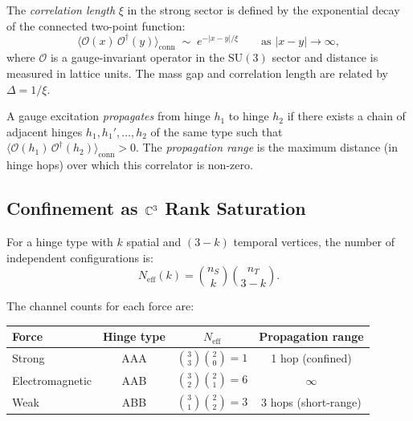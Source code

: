 \begin{definition}
\label{def:correlation}
The \emph{correlation length} $\xi$ in the strong sector is defined by
the exponential decay of the connected two-point function:
\begin{equation}
\langle \mathcal{O}(x)\, \mathcal{O}^\dagger(y) \rangle_{\mathrm{conn}}
\;\sim\; e^{-|x - y|/\xi} \qquad \text{as } |x-y| \to \infty,
\end{equation}
where $\mathcal{O}$ is a gauge-invariant operator in the
$\mathrm{SU}(3)$ sector and distance is measured in lattice units.
The mass gap and correlation length are related by $\Delta = 1/\xi$.
\end{definition}

\begin{definition}[Propagation]
\label{def:propagation}
A gauge excitation \emph{propagates} from hinge $h_1$ to hinge $h_2$
if there exists a chain of adjacent hinges $h_1, h_1', \ldots, h_2$
of the same type such that $\langle \mathcal{O}(h_1)\,
\mathcal{O}^\dagger(h_2) \rangle_{\mathrm{conn}} > 0$.
The \emph{propagation range} is the maximum distance (in hinge hops)
over which this correlator is non-zero.
\end{definition}

\subsection{Confinement as $\mathbb{C}^3$ Rank Saturation}
\label{sec:confinement}

\begin{definition}
For a hinge type with $k$ spatial and $(3-k)$ temporal vertices, the
number of independent configurations is:
\begin{equation}
N_{\mathrm{eff}}(k) = \binom{n_S}{k} \binom{n_T}{3-k}.
\end{equation}
\end{definition}

\noindent
The channel counts for each force are:

\begin{center}
\begin{tabular}{lccc}
\hline
Force & Hinge type & $N_{\mathrm{eff}}$ & Propagation range \\
\hline
Strong & AAA & $\binom{3}{3}\binom{2}{0} = 1$ & 1 hop (confined) \\
Electromagnetic & AAB & $\binom{3}{2}\binom{2}{1} = 6$ & $\infty$ \\
Weak & ABB & $\binom{3}{1}\binom{2}{2} = 3$ & 3 hops (short-range) \\
\hline
\end{tabular}
\end{center}

